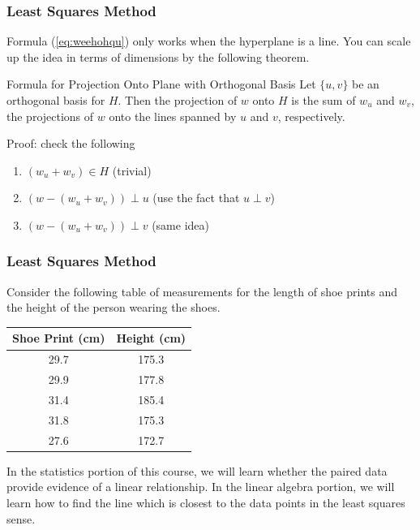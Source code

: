 \documentclass[xcolor=dvipsnames]{beamer}
\begin{document}
\begin{frame}
  \frametitle{Least Squares Method}
  Formula (\ref{eq:weehohqu}) only works when the hyperplane is a
  line. You can scale up the idea in terms of dimensions by the
  following theorem.
  \begin{block}{Formula for Projection Onto Plane with Orthogonal
      Basis}
    Let $\{u,v\}$ be an orthogonal basis for $H$. Then the projection
    of $w$ onto $H$ is the sum of $w_{u}$ and $w_{v}$, the projections
    of $w$ onto the lines spanned by $u$ and $v$, respectively.
  \end{block}
  Proof: check the following
  \begin{enumerate}
  \item $(w_{u}+w_{v})\in{}H$ (trivial)
  \item $(w-(w_{u}+w_{v}))\perp{}u$ (use the fact that $u\perp{}v$)
  \item $(w-(w_{u}+w_{v}))\perp{}v$ (same idea)
  \end{enumerate}
\end{frame}

\begin{frame}
  \frametitle{Least Squares Method}
  Consider the following table of measurements for the length of shoe
  prints and the height of the person wearing the shoes.

  \medskip
  
  \begin{tabular}{|c|c|}\hline
    Shoe Print (cm) & Height (cm) \\ \hline
    29.7 & 175.3 \\ \hline
    29.9 & 177.8 \\ \hline
    31.4 & 185.4 \\ \hline
    31.8 & 175.3 \\ \hline
    27.6 & 172.7 \\ \hline
  \end{tabular}

  \medskip
  
  In the statistics portion of this course, we will learn whether the
  paired data provide evidence of a linear relationship. In the linear
  algebra portion, we will learn how to find the line which is closest
  to the data points in the least squares sense.
\end{frame}
\end{document}
